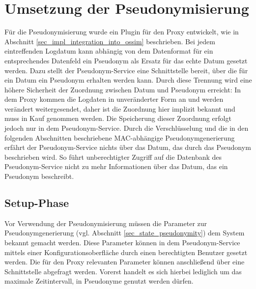 \section{Umsetzung der Pseudonymisierung} %

\label{sec_impl_pseudonymity}





Für die Pseudonymisierung wurde ein Plugin für den Proxy entwickelt, wie in Abschnitt \ref{sec_impl_integration_into_ossim} beschrieben. Bei jedem eintreffenden Logdatum kann abhängig von dem Datenformat für ein entsprechendes Datenfeld ein Pseudonym als Ersatz für das echte Datum gesetzt werden. Dazu stellt der Pseudonym-Service eine Schnittstelle bereit, über die für ein Datum ein Pseudonym erhalten werden kann. Durch diese Trennung wird eine höhere Sicherheit der Zuordnung zwischen Datum und Pseudonym erreicht: In dem Proxy kommen die Logdaten in unveränderter Form an und werden verändert weitergesendet, daher ist die Zuordnung hier implizit bekannt und muss in Kauf genommen werden. Die Speicherung dieser Zuordnung erfolgt jedoch nur in dem Pseudonym-Service. Durch die Verschlüsselung und die in den folgenden Abschnitten beschriebene MAC-abhängige Pseudonymgenerierung erfährt der Pseudonym-Service nichts über das Datum, das durch das Pseudonym beschrieben wird. So führt unberechtigter Zugriff auf die Datenbank des Pseudonym-Service nicht zu mehr Informationen über das Datum, das ein Pseudonym beschreibt.

\subsection{Setup-Phase}

Vor Verwendung der Pseudonymisierung müssen die Parameter zur Pseudonymgenerierung (vgl. Abschnitt \ref{sec_state_pseudonymity}) dem System bekannt gemacht werden. Diese Parameter können in dem Pseudonym-Service mittels einer Konfigurationsoberfläche durch einen berechtigten Benutzer gesetzt werden. Die für den Proxy relevanten Parameter können anschließend über eine Schnittstelle abgefragt werden. Vorerst handelt es sich hierbei lediglich um das maximale Zeitintervall, in Pseudonyme genutzt werden dürfen.

